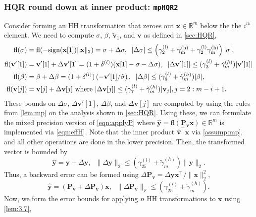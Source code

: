 \documentclass[review,onefignum,onetabnum]{siamart190516}
\newcommand{\R}{\mathbb{R}}
\newcommand{\dd}{\delta}
\newcommand{\bb}[1]{\mathbf{#1}}
\newcommand{\fl}{\mathrm{fl}}
\begin{document}
\subsubsection{HQR round down at inner product: {\tt mpHQR2}}
Consider forming an HH transformation that zeroes out $\bb{x}\in\R^m$ below the the $i^{th}$ element. 
We need to compute $\sigma$, $\beta$, $\tilde{\bb{v}}_1$, and $\bb{v}$ as defined in \cref{sec:HQR},
\begin{align}
\fl(\sigma) &= \fl(-\rm{sign}(\bb{x}[1])\|\bb{x}\|_2) = \sigma + \Delta \sigma,\;\;|\Delta\sigma| \leq \left(\gamma_{2}^{(l)}+\gamma_{m}^{(h)}+\gamma_{2}^{(l)}\gamma_{m}^{(h)}\right)|\sigma|,\label{eqn:mpsigma}\\
\fl(\bb{v}'[1])& =\bb{v}'[1] + \Delta \bb{v}'[1] = (1+\dd^{(l)}) (\bb{x}[1]-\sigma-\Delta\sigma), \;\;|\Delta\bb{v}'[1]| \leq (\gamma_{3}^{(l)}+\tilde{\gamma}_{m}^{(h)})|\bb{v}'[1]| \label{eqn:mpv1}\\
\fl(\beta) &= \beta +\Delta \beta= (1+\dd^{(l)})\left(-\bb{v}'[1]/\hat{\sigma}\right), \;\; |\Delta\beta| \leq (\gamma_{8}^{(l)}+\tilde{\gamma}_{m}^{(h)})|\beta|, \label{eqn:mpbeta}\\
	\fl(\bb{v}[j])	&= \bb{v}[j] + \Delta \bb{v}[j]\text{ where }|\Delta \bb{v}[j]|\leq 
	(\gamma_{7}^{(l)} + \tilde{\gamma}_{m}^{(h)})|\bb{v}_j|,j=2:m-i+1 \label{eqn:mpv}. 
\end{align}
These bounds on $\Delta\sigma$, $\Delta \bb{v}'[1]$, $\Delta \beta$, and $\Delta \bb{v}[j]$ are computed by using the rules from \cref{lem:mp} on the analysis shown in \cref{sec:HQR}.
Using these, we can formulate the mixed precision version of \cref{eqn:applyP} where $\hat{\bb{y}}=\fl(\bb{P_vx})\in\R^m$ is implemented via \cref{eqn:effH}.
Note that the inner product $\hat{\bb{v}}^{\top}\bb{x}$ via \cref{assump:mp}, and all other operations are done in the lower precision.
Then, the transformed vector is bounded by
\begin{equation}
	\hat{\bb{y}} = \bb{y}+\Delta \bb{y},\;\; \|\Delta \bb{y}\|_2 \leq (\gamma_{25}^{(l)} + \tilde{\gamma}_{m}^{(h)})\|\bb{y}\|_2.\label{eqn:mpdelty}
\end{equation}
Thus, a backward error can be formed using $\Delta \bb{P_v} = \Delta \bb{y}\bb{x}^{
\top}/\|\bb{x}\|_2^2$,
\begin{equation}
	\hat{\bb{y}} = (\bb{P_v} + \Delta \bb{P_v})\bb{x},\;\; \|\Delta \bb{P_v}\|_F\leq (\gamma_{25}^{(l)} + \tilde{\gamma}_{m}^{(h)}). \label{eqn:mpapplyP}
\end{equation}
Now, we form the error bounds for applying $n$ HH transformations to $\bb{x}$ using \cref{lem:3.7},
\end{document}
